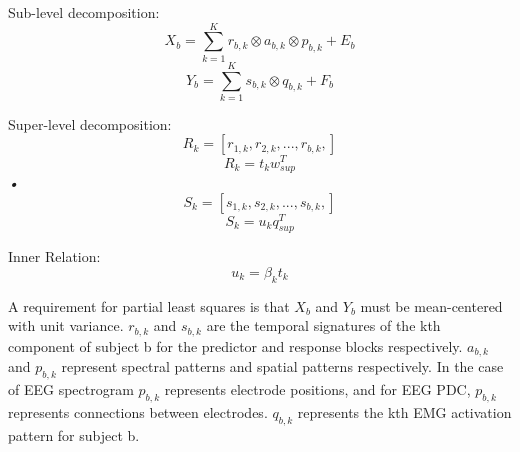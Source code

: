 \documentclass[11pt]{article}
\begin{document}
Sub-level decomposition:
\[X_b = \sum_{k=1}^K r_{b,k} \otimes a_{b,k} \otimes p_{b,k} + E_b\]
\[Y_b = \sum_{k=1}^K s_{b,k} \otimes q_{b,k} + F_b\]

Super-level decomposition:
\[R_k = [r_{1,k}, r_{2,k}, ..., r_{b,k},] \]
\[R_k = t_k w_{sup}^T \]\textsl{•}
\[S_k = [s_{1,k}, s_{2,k}, ..., s_{b,k},] \]
\[S_k = u_k q_{sup}^T \]

Inner Relation:
\[u_k = \beta_k t_k \]

A requirement for partial least squares is that $X_b$ and $Y_b$ must be mean-centered with unit variance. $r_{b,k}$ and $s_{b,k}$ are the temporal signatures of the kth component of subject b for the predictor and response blocks respectively. $a_{b,k}$ and $p_{b,k}$ represent spectral patterns and spatial patterns respectively.  In the case of EEG spectrogram $p_{b,k}$ represents electrode positions, and for EEG PDC, $p_{b,k}$ represents connections between electrodes. $q_{b,k}$ represents the kth EMG activation pattern for subject b.  
\end{document}
